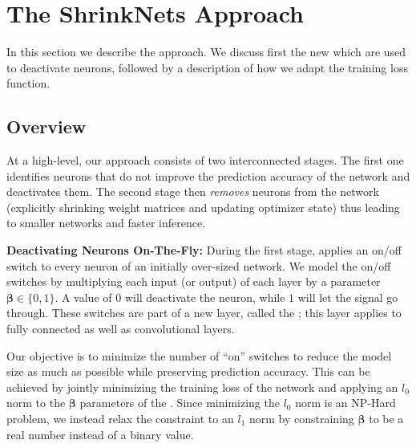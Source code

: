 
\section{The ShrinkNets Approach}
\label{sec:approach}

In this section we describe the \shrink approach. We discuss first the new \swls
which are used to deactivate neurons, followed by a description of how we adapt
the training loss function.


\subsection{Overview}

At a high-level, our approach consists of two interconnected stages.
The first one identifies neurons that do not improve the
prediction accuracy of the network and deactivates them. 
The second stage then {\it removes} neurons from the network (explicitly
shrinking weight matrices and updating optimizer state) thus leading to 
smaller networks and faster inference. 

\noindent\textbf{Deactivating Neurons On-The-Fly: }During the first stage,
\shrink applies an on/off switch to every neuron of an initially over-sized
network. We model the on/off switches by multiplying each input (or output) of
each layer by a parameter $\bm{\beta}\in\{0,1\}$. A value of $0$
will deactivate the neuron, while $1$ will let the signal go through. These
switches are part of a new layer, called the \swl; this layer applies 
to fully connected as well as convolutional layers.

Our objective is to minimize the number of ``on'' switches to reduce the model size as much
as possible while preserving prediction accuracy. This can be achieved by jointly
minimizing the training loss of the network and applying an $l_0$ norm to the 
$\bm{\beta}$ parameters of the \swl. 
Since minimizing the $l_0$ norm is an NP-Hard problem, we instead relax the constraint
to an $l_1$ norm by constraining $\bm{\beta}$ to be a real number
instead of a binary value.

